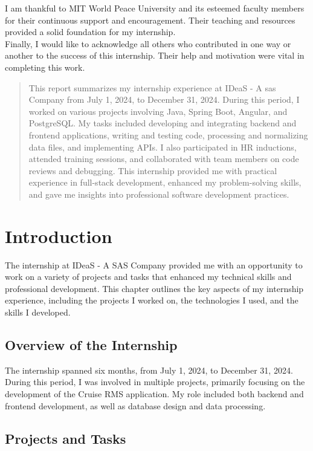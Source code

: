 \documentclass[openany, 11pt]{report} %
\begin{document}
I am thankful to MIT World Peace University and its esteemed faculty members for their continuous support and encouragement. Their teaching and resources provided a solid foundation for my internship.\\

Finally, I would like to acknowledge all others who contributed in one way or another to the success of this internship. Their help and motivation were vital in completing this work.\\

\begin{abstract}
    This report summarizes my internship experience at IDeaS - A sas Company from July 1, 2024, to December 31, 2024. During this period, I worked on various projects involving Java, Spring Boot, Angular, and PostgreSQL. My tasks included developing and integrating backend and frontend applications, writing and testing code, processing and normalizing data files, and implementing APIs. I also participated in HR inductions, attended training sessions, and collaborated with team members on code reviews and debugging. This internship provided me with practical experience in full-stack development, enhanced my problem-solving skills, and gave me insights into professional software development practices.
\end{abstract}

\setcounter{page}{1}

\chapter{Introduction}
The internship at IDeaS - A SAS Company provided me with an opportunity to work on a variety of projects and tasks that enhanced my technical skills and professional development. This chapter outlines the key aspects of my internship experience, including the projects I worked on, the technologies I used, and the skills I developed.

\section{Overview of the Internship}
The internship spanned six months, from July 1, 2024, to December 31, 2024. During this period, I was involved in multiple projects, primarily focusing on the development of the Cruise RMS application. My role included both backend and frontend development, as well as database design and data processing.

\section{Projects and Tasks}
\end{document}
